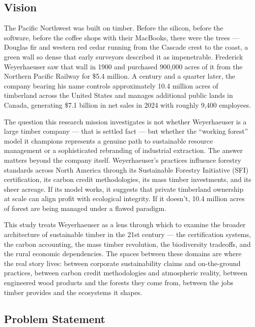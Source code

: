 \documentclass[11pt,letterpaper]{article}
\begin{document}
\subsection{Vision}

The Pacific Northwest was built on timber. Before the silicon, before the software, before the coffee shops with their MacBooks, there were the trees --- Douglas fir and western red cedar running from the Cascade crest to the coast, a green wall so dense that early surveyors described it as impenetrable. Frederick Weyerhaeuser saw that wall in 1900 and purchased 900,000 acres of it from the Northern Pacific Railway for \$5.4 million. A century and a quarter later, the company bearing his name controls approximately 10.4 million acres of timberland across the United States and manages additional public lands in Canada, generating \$7.1 billion in net sales in 2024 with roughly 9,400 employees.

The question this research mission investigates is not whether Weyerhaeuser is a large timber company --- that is settled fact --- but whether the ``working forest'' model it champions represents a genuine path to sustainable resource management or a sophisticated rebranding of industrial extraction. The answer matters beyond the company itself. Weyerhaeuser's practices influence forestry standards across North America through its Sustainable Forestry Initiative (SFI) certification, its carbon credit methodologies, its mass timber investments, and its sheer acreage. If its model works, it suggests that private timberland ownership at scale can align profit with ecological integrity. If it doesn't, 10.4 million acres of forest are being managed under a flawed paradigm.

This study treats Weyerhaeuser as a lens through which to examine the broader architecture of sustainable timber in the 21st century --- the certification systems, the carbon accounting, the mass timber revolution, the biodiversity tradeoffs, and the rural economic dependencies. The spaces between these domains are where the real story lives: between corporate sustainability claims and on-the-ground practices, between carbon credit methodologies and atmospheric reality, between engineered wood products and the forests they come from, between the jobs timber provides and the ecosystems it shapes.

\subsection{Problem Statement}
\end{document}
